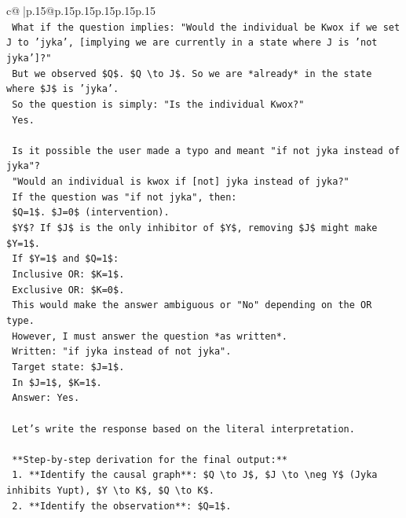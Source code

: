 \documentclass{article}
\begin{document}
{\begin{supertabular}{c@{$\;$}|p{.15\linewidth}@{}p{.15\linewidth}p{.15\linewidth}p{.15\linewidth}p{.15\linewidth}p{.15\linewidth}}
{{{\\ 
\texttt{    What if the question implies: "Would the individual be Kwox if we set J to 'jyka', {[}implying we are currently in a state where J is 'not jyka'{]}?"} \\
\texttt{    But we observed \$Q\$. \$Q \textbackslash{}to J\$. So we are *already* in the state where \$J\$ is 'jyka'.} \\
\texttt{    So the question is simply: "Is the individual Kwox?"} \\
\texttt{    Yes.} \\
\\ 
\texttt{    Is it possible the user made a typo and meant "if not jyka instead of jyka"?} \\
\texttt{    "Would an individual is kwox if {[}not{]} jyka instead of jyka?"} \\
\texttt{    If the question was "if not jyka", then:} \\
\texttt{    \$Q=1\$. \$J=0\$ (intervention).} \\
\texttt{    \$Y\$? If \$J\$ is the only inhibitor of \$Y\$, removing \$J\$ might make \$Y=1\$.} \\
\texttt{    If \$Y=1\$ and \$Q=1\$:} \\
\texttt{    Inclusive OR: \$K=1\$.} \\
\texttt{    Exclusive OR: \$K=0\$.} \\
\texttt{    This would make the answer ambiguous or "No" depending on the OR type.} \\
\texttt{    However, I must answer the question *as written*.} \\
\texttt{    Written: "if jyka instead of not jyka".} \\
\texttt{    Target state: \$J=1\$.} \\
\texttt{    In \$J=1\$, \$K=1\$.} \\
\texttt{    Answer: Yes.} \\
\\ 
\texttt{    Let's write the response based on the literal interpretation.} \\
\\ 
\texttt{    **Step{-}by{-}step derivation for the final output:**} \\
\texttt{    1.  **Identify the causal graph**: \$Q \textbackslash{}to J\$, \$J \textbackslash{}to \textbackslash{}neg Y\$ (Jyka inhibits Yupt), \$Y \textbackslash{}to K\$, \$Q \textbackslash{}to K\$.} \\
\texttt{    2.  **Identify the observation**: \$Q=1\$.} \\
}}}
\end{supertabular}}
\end{document}
